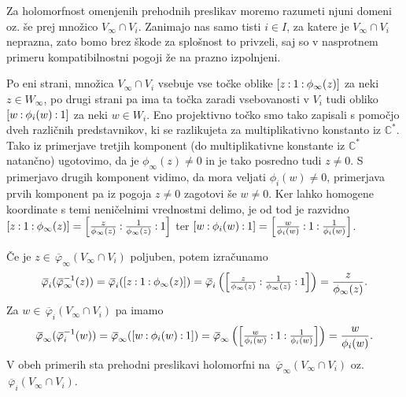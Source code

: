 \documentclass[mat1]{fmfdelo}
\numberwithin{equation}{section}
\newcommand{\CM}{\mathbb C ^*}
\newcommand{\inv}{^{-1}}
\newcommand{\pcoor}[1]{%
\begingroup\lccode`~=`: \lowercase{\endgroup
\edef~}{\mathbin{\mathchar\the\mathcode`:}\nobreak}%
\left[%
\begingroup
\mathcode`:=\string"8000
#1%
\endgroup
\right]%
}
\newcommand{\olsi}[1]{\,\overline{\!{#1}}} %
\theoremstyle{definition}
\begin{document}
Za holomorfnost omenjenih prehodnih preslikav moremo razumeti njuni domeni oz. še prej množico $V_\infty \cap V_i$. Zanimajo nas samo tisti $i \in I$, za katere je $V_\infty \cap V_i$ neprazna, zato bomo brez škode za splošnost to privzeli, saj so v nasprotnem primeru kompatibilnostni pogoji že na prazno izpolnjeni. 

Po eni strani, množica $V_\infty \cap V_i$ vsebuje vse točke oblike $\pcoor{z : 1 : \phi_\infty(z)}$ za neki $z \in W_\infty$, po drugi strani pa ima ta točka zaradi vsebovanosti v $V_i$ tudi obliko $\pcoor{w : \phi_i(w) : 1}$ za neki $w \in W_i$. Eno projektivno točko smo tako zapisali s pomočjo dveh različnih predstavnikov, ki se razlikujeta za multiplikativno konstanto iz $\CM$. Tako iz primerjave tretjih komponent (do multiplikativne konstante iz $\CM$ natančno) ugotovimo, da je $\phi_\infty(z) \neq 0$ in je tako posredno tudi $z \neq 0$. S primerjavo drugih komponent vidimo, da mora veljati $\phi_i(w) \neq 0$, primerjava prvih komponent pa iz pogoja $z \neq 0$ zagotovi še $w \neq 0$. Ker lahko homogene koordinate s temi neničelnimi vrednostmi delimo, je od tod je razvidno $\pcoor{z : 1 : \phi_\infty(z)} = \pcoor{\tfrac{z}{\phi_\infty(z)} : \tfrac{1}{\phi_\infty(z)} : 1}$ ter $\pcoor{w : \phi_i(w) : 1} = \pcoor{\tfrac{w}{\phi_i(w)} : 1 : \tfrac{1}{\phi_i(w)}}$. 

Če je $z \in \olsi{\varphi}_\infty(V_\infty \cap V_i)$ poljuben, potem izračunamo 
\[
    \olsi{\varphi}_i (\olsi{\varphi}_\infty\inv (z)) = 
    \olsi{\varphi}_i (\pcoor{z : 1 : \phi_\infty(z)}) = 
    \olsi{\varphi}_i \left(\pcoor{\tfrac{z}{\phi_\infty(z)} : \tfrac{1}{\phi_\infty(z)} : 1}\right) = 
    \frac{z}{\phi_\infty(z)}.
\]
Za $w \in \olsi{\varphi}_i(V_\infty \cap V_i)$ pa imamo
\[
    \olsi{\varphi}_\infty (\olsi{\varphi}_i\inv(w)) =
    \olsi{\varphi}_\infty (\pcoor{w : \phi_i(w) : 1}) =
    \olsi{\varphi}_\infty \left(\pcoor{\tfrac{w}{\phi_i(w)} : 1 : \tfrac{1}{\phi_i(w)}}\right) =
    \frac{w}{\phi_i(w)}.
\]
V obeh primerih sta prehodni preslikavi holomorfni na $\olsi{\varphi}_\infty(V_\infty \cap V_i)$ oz. $\olsi{\varphi}_i(V_\infty \cap V_i)$.
\end{document}
